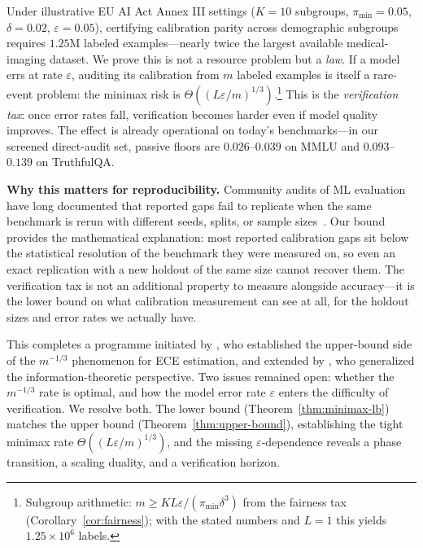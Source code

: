 \documentclass{article}
\newcommand{\Lip}{L}
\newcommand{\errrate}{\varepsilon}
\newcommand{\nsamples}{m}
\newcommand{\groupprop}{\pi}
\newcommand{\targetacc}{\delta}
\theoremstyle{definition}
\begin{document}
Under illustrative EU AI Act Annex III settings ($K{=}10$ subgroups, $\groupprop_{\min}{=}0.05$, $\targetacc{=}0.02$, $\errrate{=}0.05$), certifying calibration parity across demographic subgroups requires $1.25$M labeled examples---nearly twice the largest available medical-imaging dataset. We prove this is not a resource problem but a \emph{law}. If a model errs at rate $\errrate$, auditing its calibration from $\nsamples$ labeled examples is itself a rare-event problem: the minimax risk is $\Theta((\Lip\errrate/\nsamples)^{1/3})$.\footnote{Subgroup arithmetic: $\nsamples \geq K\Lip\errrate/(\groupprop_{\min}\targetacc^3)$ from the fairness tax (Corollary~\ref{cor:fairness}); with the stated numbers and $\Lip{=}1$ this yields $1.25{\times}10^6$ labels.} This is the \emph{verification tax}: once error rates fall, verification becomes harder even if model quality improves. The effect is already operational on today's benchmarks---in our screened direct-audit set, passive floors are $0.026$--$0.039$ on MMLU and $0.093$--$0.139$ on TruthfulQA.

\textbf{Why this matters for reproducibility.} Community audits of ML evaluation have long documented that reported gaps fail to replicate when the same benchmark is rerun with different seeds, splits, or sample sizes~\citep{pineau2021improving,bouthillier2021accounting}. Our bound provides the mathematical explanation: most reported calibration gaps sit below the statistical resolution of the benchmark they were measured on, so even an exact replication with a new holdout of the same size cannot recover them. The verification tax is not an additional property to measure alongside accuracy—it is the lower bound on what calibration measurement can see at all, for the holdout sizes and error rates we actually have.

This completes a programme initiated by \citet{sun2023recalibration}, who established the upper-bound side of the $m^{-1/3}$ phenomenon for ECE estimation, and extended by \citet{futami2024information}, who generalized the information-theoretic perspective. Two issues remained open: whether the $m^{-1/3}$ rate is optimal, and how the model error rate $\errrate$ enters the difficulty of verification. We resolve both. The lower bound (Theorem~\ref{thm:minimax-lb}) matches the upper bound (Theorem~\ref{thm:upper-bound}), establishing the tight minimax rate $\Theta((\Lip\errrate/\nsamples)^{1/3})$, and the missing $\errrate$-dependence reveals a phase transition, a scaling duality, and a verification horizon.
\end{document}

